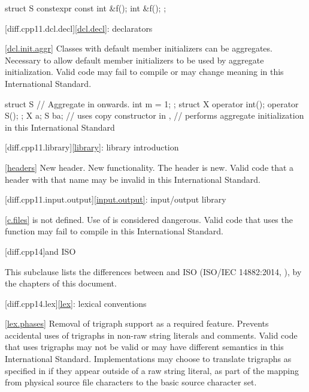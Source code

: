 \begin{codeblock}
struct S {
  constexpr const int &f();
  int &f();
};
\end{codeblock}

[diff.cpp11.dcl.decl]{\ref{dcl.decl}: declarators}

\ref{dcl.init.aggr}
\change Classes with default member initializers can be aggregates.
\rationale Necessary to allow default member initializers to be used
by aggregate initialization.
\effect
Valid \CppXI code may fail to compile or may change meaning in this International Standard.
\begin{codeblock}
struct S { // Aggregate in \CppXIV onwards.
  int m = 1;
};
struct X {
  operator int();
  operator S();
};
X a{};
S b{a};  // uses copy constructor in \CppXI,
         // performs aggregate initialization in this International Standard
\end{codeblock}

[diff.cpp11.library]{\ref{library}: library introduction}

\ref{headers}
\change New header.
\rationale New functionality.
\effect
The \Cpp header  is new.
Valid \CppXI code that  a header with that name may be
invalid in this International Standard.

[diff.cpp11.input.output]{\ref{input.output}: input/output library}

\ref{c.files}
\change {} is not defined.
\rationale Use of  is considered dangerous.
\effect
Valid \CppXI code that uses the  function may fail to compile
in this International Standard.

[diff.cpp14]{\Cpp and ISO \CppXIV}

\pnum
{}%
This subclause lists the differences between \Cpp and
ISO \CppXIV (ISO/IEC 14882:2014, ),
by the chapters of this document.

[diff.cpp14.lex]{\ref{lex}: lexical conventions}

\ref{lex.phases}
%
\change Removal of trigraph support as a required feature.
\rationale Prevents accidental uses of trigraphs in non-raw string literals and comments.
\effect
Valid \CppXIV code that uses trigraphs may not be valid or may have different
semantics in this International Standard. Implementations may choose to
translate trigraphs as specified in \CppXIV if they appear outside of a raw
string literal, as part of the  mapping from physical source file characters to
the basic source character set.

